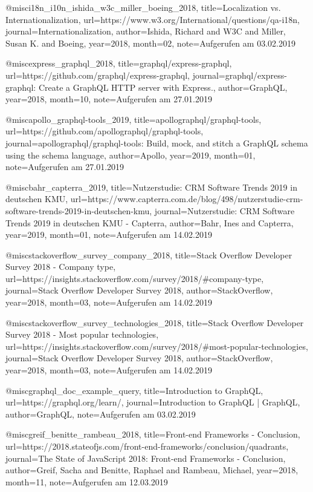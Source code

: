 
@misc{i18n_i10n_ishida_w3c_miller_boeing_2018, title={Localization vs. Internationalization}, url={https://www.w3.org/International/questions/qa-i18n}, journal={Internationalization}, author={Ishida, Richard and W3C and Miller, Susan K. and Boeing}, year={2018}, month={02}, note={Aufgerufen am 03.02.2019}}

@misc{express_graphql_2018, title={graphql/express-graphql}, url={https://github.com/graphql/express-graphql}, journal={graphql/express-graphql: Create a GraphQL HTTP server with Express.}, author={GraphQL}, year={2018}, month={10}, note={Aufgerufen am 27.01.2019}}

@misc{apollo_graphql-tools_2019, title={apollographql/graphql-tools}, url={https://github.com/apollographql/graphql-tools}, journal={apollographql/graphql-tools: Build, mock, and stitch a GraphQL schema using the schema language}, author={Apollo}, year={2019}, month={01}, note={Aufgerufen am 27.01.2019}}

@misc{bahr_capterra_2019, title={Nutzerstudie: CRM Software Trends 2019 in deutschen KMU}, url={https://www.capterra.com.de/blog/498/nutzerstudie-crm-software-trends-2019-in-deutschen-kmu}, journal={Nutzerstudie: CRM Software Trends 2019 in deutschen KMU - Capterra}, author={Bahr, Ines and Capterra}, year={2019}, month={01}, note={Aufgerufen am 14.02.2019}}

@misc{stackoverflow_survey_company_2018, title={Stack Overflow Developer Survey 2018 - Company type}, url={https://insights.stackoverflow.com/survey/2018/#company-type}, journal={Stack Overflow Developer Survey 2018}, author={StackOverflow}, year={2018}, month={03}, note={Aufgerufen am 14.02.2019}}

@misc{stackoverflow_survey_technologies_2018, title={Stack Overflow Developer Survey 2018 - Most popular technologies}, url={https://insights.stackoverflow.com/survey/2018/#most-popular-technologies}, journal={Stack Overflow Developer Survey 2018}, author={StackOverflow}, year={2018}, month={03}, note={Aufgerufen am 14.02.2019}}

@misc{graphql_doc_example_query, title={Introduction to GraphQL}, url={https://graphql.org/learn/}, journal={Introduction to GraphQL | GraphQL}, author={GraphQL}, note={Aufgerufen am 03.02.2019}}

@misc{greif_benitte_rambeau_2018, title={Front-end Frameworks - Conclusion}, url={https://2018.stateofjs.com/front-end-frameworks/conclusion/quadrants}, journal={The State of JavaScript 2018: Front-end Frameworks - Conclusion}, author={Greif, Sacha and Benitte, Raphael and Rambeau, Michael}, year={2018}, month={11}, note={Aufgerufen am 12.03.2019}}

